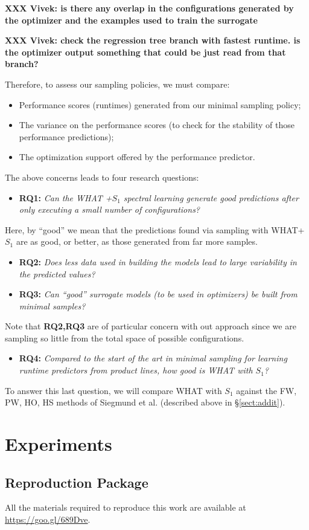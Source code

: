\documentclass{sig-alternative}
\newcommand{\bi}{\begin{itemize}}%
\newcommand{\ei}{\end{itemize}}
\newcommand{\tion}[1]{\S\ref{sect:#1}}
\begin{document}
{\bf XXX Vivek: is there any overlap in the
configurations generated by the optimizer and the
examples used to train the surrogate}

{\bf XXX Vivek: check the regression tree branch with
fastest runtime. is the optimizer output
something that could be just read from that branch?}


Therefore, to assess our sampling policies, we must compare:
\bi
\item Performance scores (runtimes) generated from our minimal sampling policy;
\item The variance on the performance scores (to check for the stability
of those performance predictions);
\item The optimization support offered by the performance predictor.
\ei
The above concerns leads to four research questions:
\bi
\item {\bf RQ1:} {\em Can the WHAT  +$S_1$ spectral learning generate good predictions after only
executing a small number of configurations?}
\ei
Here, by ``good'' we mean that the predictions found via sampling with WHAT+$S_1$ are as good, or better,
as those generated from far more samples.
\bi
\item {\bf RQ2:} {\em
Does less data used in building the models lead to large variability in the predicted values?}
\item {\bf RQ3:} {\em
Can ``good'' surrogate models (to be used in optimizers)
be built from minimal samples?}
\ei
Note that {\bf RQ2,RQ3} are of particular concern with out approach
since we are sampling so little from the total space of possible
configurations.
\bi
\item {\bf RQ4:} {\em Compared to the start of the art in minimal sampling for
learning runtime predictors from product lines, how good is WHAT with $S_1$?}
\ei
To answer this last question, we will compare WHAT with $S_1$
          against the FW, PW, HO, HS methods of Siegmund et al. (described above in \tion{addit}).
 
\section{Experiments}

\subsection{Reproduction Package}

All the materials required to reproduce this work are available at \url{https://goo.gl/689Dve}.
\end{document}
